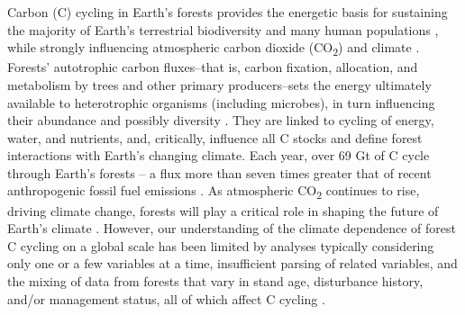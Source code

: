 \documentclass[
]{article}
\begin{document}
Carbon (C) cycling in Earth's forests provides the energetic basis for
sustaining the majority of Earth's terrestrial biodiversity and many
human populations
\citep{millennium_ecosystem_assessment_ecosystems_2005}, while strongly
influencing atmospheric carbon dioxide (CO\textsubscript{2}) and climate
\citep{bonan_forests_2008}. Forests' autotrophic carbon fluxes--that is,
carbon fixation, allocation, and metabolism by trees and other primary
producers--sets the energy ultimately available to heterotrophic
organisms (including microbes), in turn influencing their abundance
\citep{zak_plant_1994, niedzialkowska_species_2010} and possibly
diversity \citep{waide_relationship_1999, chu_direct_2018}. They are
linked to cycling of energy, water, and nutrients, and, critically,
influence all C stocks and define forest interactions with Earth's
changing climate. Each year, over 69 Gt of C cycle through Earth's
forests \citep{badgley_terrestrial_2019}-- a flux more than seven times
greater that of recent anthropogenic fossil fuel emissions \citep[9.5 Gt
C yr\textsuperscript{-1};][]{friedlingstein_global_2019}. As atmospheric
CO\textsubscript{2} continues to rise, driving climate change, forests
will play a critical role in shaping the future of Earth's climate
\citep{cavaleri_urgent_2015, rogelj_mitigation_2018}. However, our
understanding of the climate dependence of forest C cycling on a global
scale has been limited by analyses typically considering only one or a
few variables at a time, insufficient parsing of related variables, and
the mixing of data from forests that vary in stand age, disturbance
history, and/or management status, all of which affect C cycling
\citep{litton_carbon_2007, gillman_latitude_2015, simova_enigma_2017}.
\end{document}
